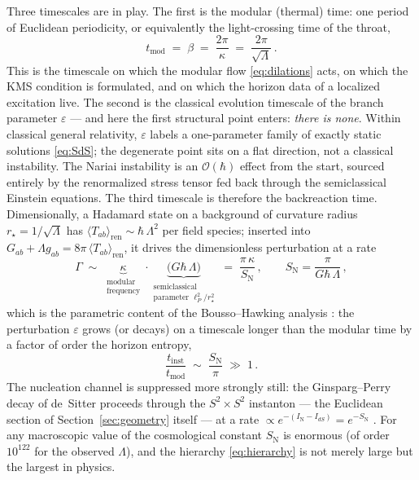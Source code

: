 \documentclass[11pt]{article}
\newcommand{\Nariai}{Nariai}
\begin{document}
Three timescales are in play. The first is the modular (thermal) time: one period of Euclidean periodicity, or equivalently the light-crossing time of the throat,
\begin{equation}
t_{\mathrm{mod}} \;=\; \beta \;=\; \frac{2\pi}{\kappa} \;=\; \frac{2\pi}{\sqrt{\Lambda}}\,.
\label{eq:t-mod}
\end{equation}
This is the timescale on which the modular flow \eqref{eq:dilations} acts, on which the KMS condition is formulated, and on which the horizon data of a localized excitation live. The second is the classical evolution timescale of the branch parameter $\varepsilon$ --- and here the first structural point enters: \emph{there is none}. Within classical general relativity, $\varepsilon$ labels a one-parameter family of exactly static solutions \eqref{eq:SdS}; the degenerate point sits on a flat direction, not a classical instability. The \Nariai{} instability is an $\mathcal{O}(\hbar)$ effect from the start, sourced entirely by the renormalized stress tensor fed back through the semiclassical Einstein equations. The third timescale is therefore the backreaction time. Dimensionally, a Hadamard state on a background of curvature radius $r_\star = 1/\sqrt{\Lambda}$ has $\langle T_{ab}\rangle_{\mathrm{ren}} \sim \hbar\,\Lambda^2$ per field species; inserted into $G_{ab} + \Lambda g_{ab} = 8\pi\, \langle T_{ab}\rangle_{\mathrm{ren}}$, it drives the dimensionless perturbation at a rate
\begin{equation}
\Gamma \;\sim\; \underbrace{\kappa}_{\substack{\text{modular}\\ \text{frequency}}} \cdot \underbrace{\big(G\hbar\,\Lambda\big)}_{\substack{\text{semiclassical}\\ \text{parameter } \ell_P^2/r_\star^2}}
\;=\; \frac{\pi\,\kappa}{S_{\mathrm{N}}}\,,
\qquad
S_{\mathrm{N}} = \frac{\pi}{G\hbar\,\Lambda}\,,
\label{eq:Gamma}
\end{equation}
which is the parametric content of the Bousso--Hawking analysis \cite{BoussoHawking}: the perturbation $\varepsilon$ grows (or decays) on a timescale longer than the modular time by a factor of order the horizon entropy,
\begin{equation}
\frac{t_{\mathrm{inst}}}{t_{\mathrm{mod}}} \;\sim\; \frac{S_{\mathrm{N}}}{\pi} \;\gg\; 1\,.
\label{eq:hierarchy}
\end{equation}
The nucleation channel is suppressed more strongly still: the Ginsparg--Perry decay of de~Sitter proceeds through the $S^2 \times S^2$ instanton --- the Euclidean section of Section~\ref{sec:geometry} itself --- at a rate $\propto e^{-(I_{\mathrm{N}} - I_{dS})} = e^{-S_{\mathrm{N}}}$ \cite{GinspargPerry}. For any macroscopic value of the cosmological constant $S_{\mathrm{N}}$ is enormous (of order $10^{122}$ for the observed $\Lambda$), and the hierarchy \eqref{eq:hierarchy} is not merely large but the largest in physics.
\end{document}
